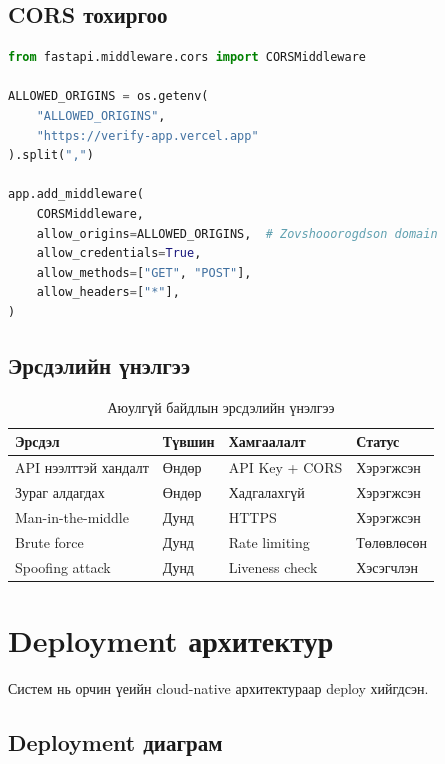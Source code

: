 \documentclass[12pt,a4paper]{article}
\begin{document}
\subsection{CORS тохиргоо}

\begin{lstlisting}[language=Python, caption={CORS Configuration}]
from fastapi.middleware.cors import CORSMiddleware

ALLOWED_ORIGINS = os.getenv(
    "ALLOWED_ORIGINS", 
    "https://verify-app.vercel.app"
).split(",")

app.add_middleware(
    CORSMiddleware,
    allow_origins=ALLOWED_ORIGINS,  # Zovshooorogdson domain
    allow_credentials=True,
    allow_methods=["GET", "POST"],
    allow_headers=["*"],
)
\end{lstlisting}

\subsection{Эрсдэлийн үнэлгээ}

\begin{table}[H]
\centering
\begin{tabular}{|p{4cm}|p{2.5cm}|p{3cm}|p{3cm}|}
\hline
\textbf{Эрсдэл} & \textbf{Түвшин} & \textbf{Хамгаалалт} & \textbf{Статус} \\
\hline
API нээлттэй хандалт & Өндөр & API Key + CORS & Хэрэгжсэн \\
\hline
Зураг алдагдах & Өндөр & Хадгалахгүй & Хэрэгжсэн \\
\hline
Man-in-the-middle & Дунд & HTTPS & Хэрэгжсэн \\
\hline
Brute force & Дунд & Rate limiting & Төлөвлөсөн \\
\hline
Spoofing attack & Дунд & Liveness check & Хэсэгчлэн \\
\hline
\end{tabular}
\caption{Аюулгүй байдлын эрсдэлийн үнэлгээ}
\end{table}

\section{Deployment архитектур}

Систем нь орчин үеийн cloud-native архитектураар deploy хийгдсэн.

\subsection{Deployment диаграм}
\end{document}
